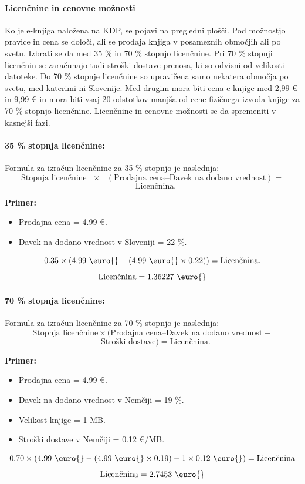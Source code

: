 \documentclass[a4paper, 12pt]{book}
\begin{document}
\paragraph{Licenčnine in cenovne možnosti}
Ko je e-knjiga naložena na KDP, se pojavi na pregledni plošči. Pod možnostjo pravice in cena se določi, ali se prodaja  knjiga v posameznih območjih ali po svetu. Izbrati se da med 35 \% in 70 \% stopnjo licenčnine. Pri 70 \% stopnji licenčnin se zaračunajo tudi stroški dostave prenosa, ki so odvisni od velikosti datoteke. Do 70 \% stopnje licenčnine so upravičena samo nekatera območja po svetu, med katerimi ni Slovenije. Med drugim mora biti cena e-knjige med 2,99 \euro{} in 9,99 \euro{} in mora biti vsaj 20 odstotkov manjša od cene fizičnega izvoda knjige za 70 \% stopnjo licenčnine. Licenčnine in cenovne možnosti se da spremeniti v kasnejši fazi.

\paragraph{35 \% stopnja licenčnine:\\} 

Formula za izračun licenčnine za 35 \% stopnjo je naslednja:
$$\textrm{Stopnja licenčnine}\textrm{ } \times \textrm{ } (\textrm{Prodajna cena}–\textrm{Davek na dodano vrednost}) =$$
$$=\textrm{Licenčnina.}$$

\textbf{Primer:}
\begin{itemize}
	\item Prodajna cena = 4.99 \euro{}.
	\item Davek na dodano vrednost v Sloveniji = 22 \%.
\end{itemize}
$$0.35 \times (4.99 \textrm{ \euro{}} - (4.99 \textrm{ \euro{}} \times 0.22))  = \textrm{Licenčnina.}$$
$$\textrm{Licenčnina} = 1.36227 \textrm{ \euro{}}$$

\paragraph{70 \% stopnja licenčnine:\\}

Formula za izračun licenčnine za 70 \% stopnjo je naslednja:
$$\textrm{Stopnja licenčnine}\times(\textrm{Prodajna cena}–\textrm{Davek na dodano vrednost}-$$
$$-\textrm{Stroški dostave})=\textrm{Licenčnina.}$$

\textbf{Primer:}
\begin{itemize}
	\item Prodajna cena = 4.99 \euro{}.
	\item Davek na dodano vrednost v Nemčiji = 19 \%.
	\item Velikost knjige = 1 MB.
	\item Stroški dostave v Nemčiji =  0.12 \euro{}/MB.
\end{itemize}
$$0.70 \times (4.99 \textrm{ \euro{}} - (4.99 \textrm{ \euro{}} \times 0.19)-1\times0.12\textrm{ \euro{}})  = \textrm{Licenčnina}$$
$$\textrm{Licenčnina} = 2.7453 \textrm{ \euro{}}$$
\end{document}
